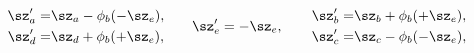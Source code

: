 \begin{equation}\label{flipfovar}\begin{aligned}
\sz_a'=& \sz_a-\phi_{b}(-\sz_e),\\
\sz_d'=& \sz_d+\phi_{b}(+\sz_e),
\end{aligned} 
\qquad \sz_e'=-\sz_e,\qquad\begin{aligned}
\sz_b'=& \sz_b+\phi_{b}(+\sz_e),\\
\sz_c'=& \sz_c-\phi_{b}(-\sz_e),
\end{aligned}
\end{equation}

